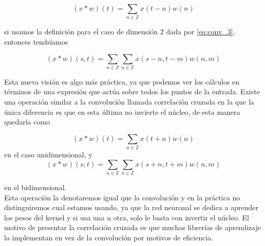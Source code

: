     \begin{equation}
        (x*w)(t) = \sum_{n \in \mathbb{Z}} x(t-n) w(n)
    \end{equation}

    \noindent si usamos la definición para el caso de dimensión $2$ dada por \eqref{eq:conv_3}, entonces tendríamos
    
    \begin{equation}
        (x*w)(s,t) = \sum_{n \in \mathbb{Z}} \sum_{n \in \mathbb{Z}} x(s-n,t-m)w(n,m)
    \end{equation}

    \noindent Esta nueva visión es algo más práctica, ya que podemos ver los cálculos  en términos de una expresión que actúa sobre todos los puntos de la entrada. Existe una operación similar a la convolución llamada correlación cruzada en la que la única diferencia es que en esta última no invierte el núcleo, de esta manera quedaría como 
    
    \begin{equation}
        (x*w)(t) = \sum_{n \in \mathbb{Z}} x(t+n) w(n)
    \end{equation}
    \noindent en el caso unidimensional, y 
    \begin{equation}
        (x*w)(s,t) = \sum_{n \in \mathbb{Z}} \sum_{n \in \mathbb{Z}} x(s+n,t+m)w(n,m)
    \end{equation}
    
    \noindent en el bidimensional. \\ 
    
    Esta operación la denotaremos igual que la convolución y en la práctica no distinguiremos cual estamos usando, ya que la red neuronal se dedica a aprender los pesos del kernel y si usa una u otra, solo le basta con invertir el núcleo. El motivo de presentar la correlación cruzada es que muchas librerías de aprendizaje la implementan en vez de la convolución por motivos de eficiencia. 
    
